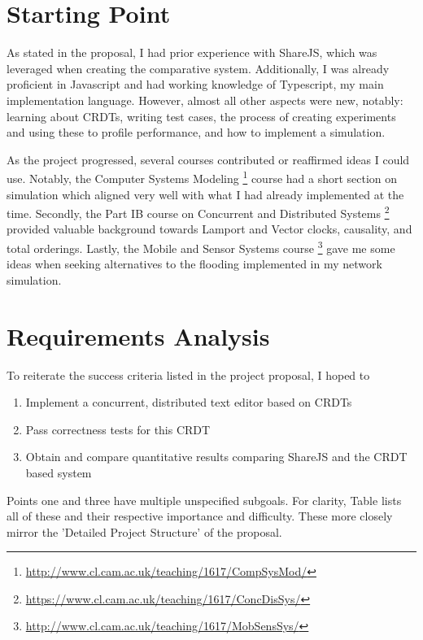 \documentclass[12pt,a4paper,twoside,openright]{report}
\begin{document}
\section{Starting Point}

As stated in the proposal, I had prior experience with ShareJS, which was leveraged when creating the comparative system. Additionally, I was already proficient in Javascript and had working knowledge of Typescript, my main implementation language. However, almost all other aspects were new, notably: learning about CRDTs, writing test cases, the process of creating experiments and using these to profile performance, and how to implement a simulation.

As the project progressed, several courses contributed or reaffirmed ideas I could use. Notably, the Computer Systems Modeling \footnote{\url{http://www.cl.cam.ac.uk/teaching/1617/CompSysMod/}} course had a short section on simulation which aligned very well with what I had already implemented at the time. Secondly, the Part IB course on Concurrent and Distributed Systems \footnote{\url{https://www.cl.cam.ac.uk/teaching/1617/ConcDisSys/}} provided valuable background towards Lamport and Vector clocks, causality, and total orderings. Lastly, the Mobile and Sensor Systems course \footnote{\url{http://www.cl.cam.ac.uk/teaching/1617/MobSensSys/}} gave me some ideas when seeking alternatives to the flooding implemented in my network simulation.

\section{Requirements Analysis}
To reiterate the success criteria listed in the project proposal, I hoped to

\begin{enumerate}
\item Implement a concurrent, distributed text editor based on CRDTs 
\item Pass correctness tests for this CRDT
\item Obtain and compare quantitative results comparing ShareJS and the CRDT based system
\end{enumerate}

Points one and three have multiple unspecified subgoals. For clarity, Table lists all of these and their respective importance and difficulty. These more closely mirror the 'Detailed Project Structure' of the proposal.
\end{document}
